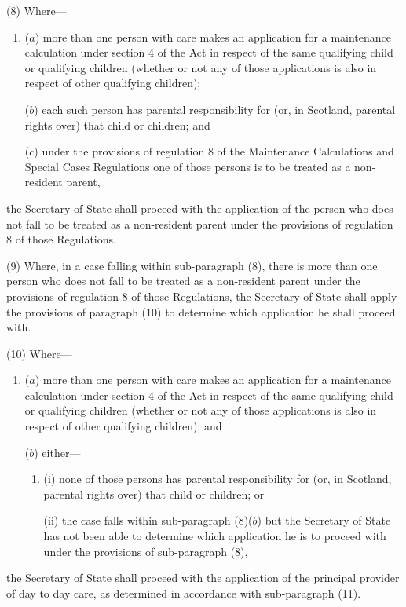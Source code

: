 \documentclass[12pt,a4paper]{article}
\begin{document}
(8) Where—
\begin{enumerate}\item[]
($a$) more than one person with care makes an application for a maintenance calculation under section 4 of the Act in respect of the same qualifying child or qualifying children (whether or not any of those applications is also in respect of other qualifying children);

($b$) each such person has parental responsibility for (or, in Scotland, parental rights over) that child or children; and

($c$) under the provisions of regulation 8 of the Maintenance Calculations and Special Cases Regulations one of those persons is to be treated as a non-resident parent,
\end{enumerate}
the Secretary of State shall proceed with the application of the person who does not fall to be treated as a non-resident parent under the provisions of regulation 8 of those Regulations.

(9) Where, in a case falling within sub-paragraph (8), there is more than one person who does not fall to be treated as a non-resident parent under the provisions of regulation 8 of those Regulations, the Secretary of State shall apply the provisions of paragraph (10) to determine which application he shall proceed with.

(10) Where—
\begin{enumerate}\item[]
($a$) more than one person with care makes an application for a maintenance calculation under section 4 of the Act in respect of the same qualifying child or qualifying children (whether or not any of those applications is also in respect of other qualifying children); and

($b$) either—
\begin{enumerate}\item[]
(i) none of those persons has parental responsibility for (or, in Scotland, parental rights over) that child or children; or

(ii) the case falls within sub-paragraph (8)($b$)  but the Secretary of State has not been able to determine which application he is to proceed with under the provisions of sub-paragraph (8),
\end{enumerate}
\end{enumerate}
the Secretary of State shall proceed with the application of the principal provider of day to day care, as determined in accordance with sub-paragraph (11).
\end{document}
